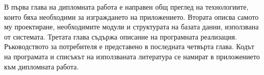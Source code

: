 В първа глава на дипломната работа е направен общ преглед на технологиите,
които бяха необходими за изграждането на приложението. Втората описва самото му
проектиране, необходимите модули и структурата на базата данни, използвана от
системата. Третата глава съдържа описание на програмната реализация.
Ръководството за потребителя е представено в последната четвърта глава. Кодът на
програмата и списъкът на използваната литература се намират в приложението към
дипломната работа.

